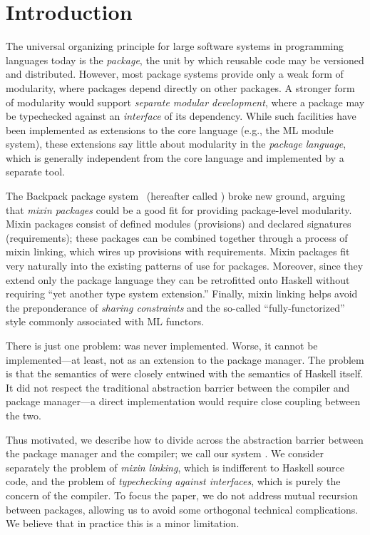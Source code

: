\chapter{Introduction}

The universal organizing principle for large software systems in
programming languages today is the \emph{package}, the unit by which
reusable code may be versioned and distributed.  However, most package systems
provide only a weak form of modularity, where packages depend directly
on other packages.  A stronger form of modularity would
support \emph{separate modular development}, where a package may be
typechecked against an \emph{interface} of its dependency.  While
such facilities have been implemented as extensions to the core
language (e.g., the ML module system), these extensions say little
about modularity in the \emph{package language}, which is generally
independent from the core language and implemented by a separate tool.

The Backpack package system~\cite{backpack}
(hereafter called \OldBackpack{}) broke new ground, arguing that \emph{mixin
packages} could be a good fit for providing package-level modularity.
Mixin packages consist of defined modules (provisions) and declared
signatures (requirements); these packages can be combined together
through a process of mixin linking, which wires up provisions with
requirements.  Mixin packages fit very naturally into the existing
patterns of use for packages. Moreover, since they extend only the package
language they can be retrofitted onto Haskell without requiring ``yet
another type system extension.''  Finally, mixin linking helps avoid the
preponderance of \emph{sharing constraints}
and the so-called ``fully-functorized'' style commonly associated with
ML functors.

There is just one problem: \OldBackpack{} was never implemented.  Worse, it
cannot be implemented---at least, not as an extension to the package
manager.  The problem is that the semantics of \OldBackpack{} were closely entwined
with the semantics of Haskell itself. It did not respect the
traditional abstraction barrier between the compiler and package
manager---a direct implementation would require close coupling between
the two.

Thus motivated, we describe how to divide
\OldBackpack{} across the abstraction barrier between the package manager and
the compiler; we call our system \Backpack{}.  We consider separately the problem of
\emph{mixin linking}, which is indifferent to Haskell source code, and
the problem of \emph{typechecking against interfaces}, which is purely
the concern of the compiler.  To focus the paper, we do not address
mutual recursion between packages, allowing us to avoid some orthogonal
technical complications. We believe that in practice this is a minor
limitation.

